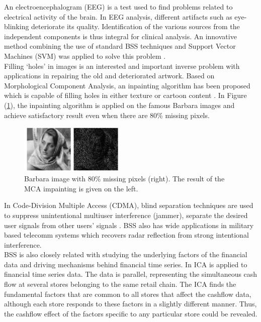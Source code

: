 An electroencephalogram (EEG) is a test used to find problems related to electrical activity of the brain. In EEG analysis, different artifacts such as eye-blinking deteriorate its quality. Identification of the various sources from the independent components is thus integral for clinical analysis. An innovative method combining the use of standard BSS techniques and Support Vector Machines (SVM) was applied to solve this problem  \cite{Duda2000PC954544}.\\

Filling `holes' in images is an interested and important inverse problem with applications in repairing the old and deteriorated artwork. Based on Morphological Component Analysis, an inpainting algorithm has been proposed  which is capable of filling holes in either texture or cartoon content \cite{ELAD2005340}. In Figure (\ref{imapint_1}), the inpainting algorithm is applied on the famous Barbara images and achieve satisfactory result even when there are 80\% missing pixels. \\

\begin{figure}[!htbp]
\centering
\includegraphics[width=0.45\textwidth]{images/impainting1.png}
\caption{Barbara image with $80\%$ missing pixels (right). The result of the MCA impainting is
given on the left.}
\label{imapint_1}
\end{figure}

In Code-Division Multiple Access (CDMA), blind separation techniques are used to suppress unintentional multiuser interference (jammer), separate the desired user signals from other users' signals \cite{Raju2006}. BSS also has wide applications in military based telecomm systems which recovers radar reflection from strong intentional interference.\\

BSS is also closely related with studying the underlying factors of the financial data and driving mechanisms behind financial time series. In \cite{OjaE2000Icaf} ICA is applied to financial time series data. The data is parallel, representing the simultaneous cash flow at several stores belonging to the same retail chain. The ICA finds the fundamental factors that are common to all stores that affect the cashflow data, although each store responds to these factors in a slightly different manner. Thus, the cashflow effect of the factors specific to any particular store could be revealed.

